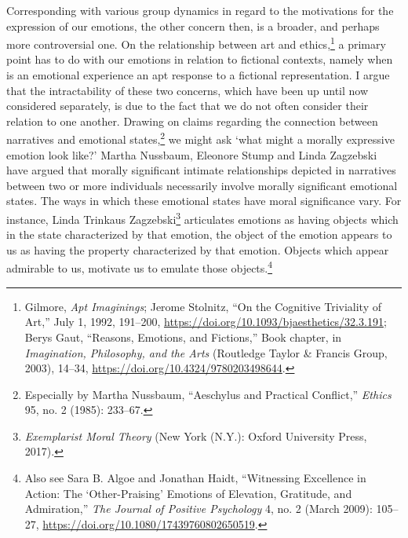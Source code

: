 \documentclass[phdthesis,12pt,final]{wuthesis}
\theoremstyle{definition}
\theoremstyle{definition}
\theoremstyle{definition}
\theoremstyle{definition}
\theoremstyle{remark}
\begin{document}
Corresponding with various group dynamics in regard to the motivations for the expression of our emotions, the other concern then, is a broader, and perhaps more controversial one. On the relationship between art and ethics,\footnote{Gilmore, \emph{Apt {Imaginings}}; Jerome Stolnitz, {``On the {Cognitive Triviality} of {Art},''} July 1, 1992, 191--200, \url{https://doi.org/10.1093/bjaesthetics/32.3.191}; Berys Gaut, {``Reasons, Emotions, and Fictions,''} Book chapter, in \emph{Imagination, {Philosophy}, and the {Arts}} (Routledge Taylor \& Francis Group, 2003), 14--34, \url{https://doi.org/10.4324/9780203498644}.} a primary point has to do with our emotions in relation to fictional contexts, namely when is an emotional experience an apt response to a fictional representation. I argue that the intractability of these two concerns, which have been up until now considered separately, is due to the fact that we do not often consider their relation to one another. Drawing on claims regarding the connection between narratives and emotional states,\footnote{Especially by Martha Nussbaum, {``Aeschylus and Practical Conflict,''} \emph{Ethics} 95, no. 2 (1985): 233--67.} we might ask `what might a morally expressive emotion look like?' Martha Nussbaum, Eleonore Stump and Linda Zagzebski have argued that morally significant intimate relationships depicted in narratives between two or more individuals necessarily involve morally significant emotional states. The ways in which these emotional states have moral significance vary. For instance, Linda Trinkaus Zagzebski\footnote{\emph{Exemplarist {Moral Theory}} (New York (N.Y.): Oxford University Press, 2017).} articulates emotions as having objects which in the state characterized by that emotion, the object of the emotion appears to us as having the property characterized by that emotion. Objects which appear admirable to us, motivate us to emulate those objects.\footnote{Also see Sara B. Algoe and Jonathan Haidt, {``Witnessing Excellence in Action: The {`Other-Praising'} Emotions of Elevation, Gratitude, and Admiration,''} \emph{The Journal of Positive Psychology} 4, no. 2 (March 2009): 105--27, \url{https://doi.org/10.1080/17439760802650519}.}
\end{document}
